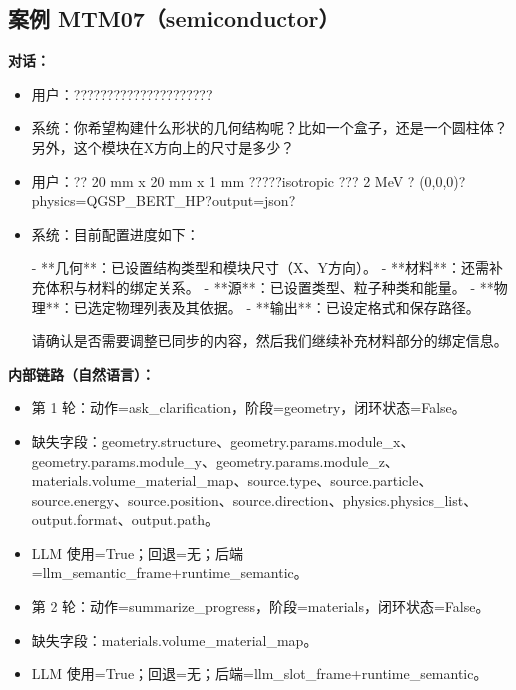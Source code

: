 \documentclass[11pt]{ctexart}
\begin{document}
\subsection{案例 MTM07（semiconductor）}
\textbf{对话：}
\begin{itemize}
\item 用户：?????????????????????
\item 系统：你希望构建什么形状的几何结构呢？比如一个盒子，还是一个圆柱体？另外，这个模块在X方向上的尺寸是多少？
\item 用户：?? 20 mm x 20 mm x 1 mm ?????isotropic ??? 2 MeV ? (0,0,0)?physics=QGSP\_BERT\_HP?output=json?
\item 系统：目前配置进度如下：

- **几何**：已设置结构类型和模块尺寸（X、Y方向）。
- **材料**：还需补充体积与材料的绑定关系。
- **源**：已设置类型、粒子种类和能量。
- **物理**：已选定物理列表及其依据。
- **输出**：已设定格式和保存路径。

请确认是否需要调整已同步的内容，然后我们继续补充材料部分的绑定信息。
\end{itemize}
\textbf{内部链路（自然语言）：}
\begin{itemize}
\item 第 1 轮：动作=ask\_clarification，阶段=geometry，闭环状态=False。
\item 缺失字段：geometry.structure、geometry.params.module\_x、geometry.params.module\_y、geometry.params.module\_z、materials.volume\_material\_map、source.type、source.particle、source.energy、source.position、source.direction、physics.physics\_list、output.format、output.path。
\item LLM 使用=True；回退=无；后端=llm\_semantic\_frame+runtime\_semantic。
\item 第 2 轮：动作=summarize\_progress，阶段=materials，闭环状态=False。
\item 缺失字段：materials.volume\_material\_map。
\item LLM 使用=True；回退=无；后端=llm\_slot\_frame+runtime\_semantic。
\end{itemize}
\end{document}
